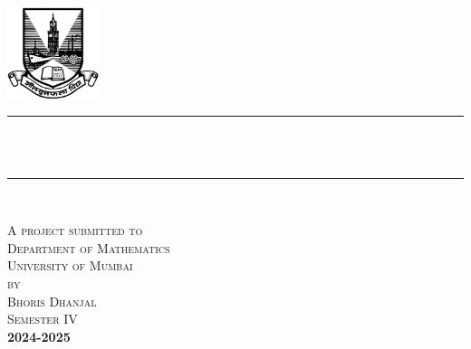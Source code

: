 \begin{titlepage}
	\newcommand{\HRule}{\rule{\linewidth}{0.5mm}} %
	
	
	
	
	\center %
	
	\begin{center}
		
		
		
		
		\includegraphics[width=0.2\textwidth]{Images/uom.png}\\[1.5cm]
		\HRule \\[0.4cm]
		{ \huge \textsc \reporttitle}\\[0.4cm] %
		\HRule \\[2.5cm]
	\end{center}
	\textsc{
		\large A project submitted to\\
		\large Department of Mathematics\\
		\large University of Mumbai\\
		\large by\\[1cm]
		\large Bhoris Dhanjal\\[1em]
		\small Semester IV}\\
	
	\vfill %
	\textbf{
		2024-2025}
			\newpage
		\ 
		\newpage
\end{titlepage}
